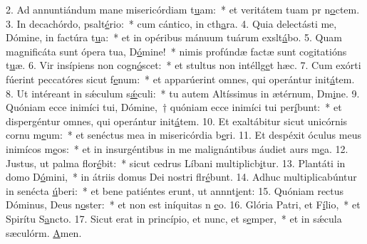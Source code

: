 2. Ad annuntiándum mane misericórdiam t\uline{u}am:~* et veritátem tuam pr n\uline{o}ctem.
3. In decachórdo, psalt\uline{é}rio:~* cum cántico, in cth\uline{a}ra.
4. Quia delectásti me, Dómine, in factúra t\uline{u}a:~* et in opéribus mánuum tuárum exslt\uline{á}bo.
5. Quam magnificáta sunt ópera tua, D\uline{ó}mine!~* nimis profúndæ factæ sunt cogitatións t\uline{u}æ.
6. Vir insípiens non cogn\uline{ó}scet:~* et stultus non intéllg\uline{e}t hæc.
7. Cum exórti fúerint peccatóres sicut f\uline{e}num:~* et apparúerint omnes, qui operántur init\uline{á}tem.
8. Ut intéreant in sǽculum s\uline{ǽ}culi:~* tu autem Altíssimus in ætérnum, Dm\uline{i}ne.
9. Quóniam ecce inimíci tui, Dómine,~† quóniam ecce inimíci tui per\uline{í}bunt:~* et dispergéntur omnes, qui operántur init\uline{á}tem.
10. Et exaltábitur sicut unicórnis cornu m\uline{e}um:~* et senéctus mea in misericórdia b\uline{e}ri.
11. Et despéxit óculus meus inimícos m\uline{e}os:~* et in insurgéntibus in me malignántibus áudiet aurs m\uline{e}a.
12. Justus, ut palma flor\uline{é}bit:~* sicut cedrus Líbani multiplicb\uline{i}tur.
13. Plantáti in domo D\uline{ó}mini,~* in átriis domus Dei nostri flr\uline{é}bunt.
14. Adhuc multiplicabúntur in senécta \uline{ú}beri:~* et bene patiéntes erunt, ut annnt\uline{i}ent:
15. Quóniam rectus Dóminus, Deus n\uline{o}ster:~* et non est iníquitas n \uline{e}o.
16. Glória Patri, et F\uline{í}lio,~* et Spirítu S\uline{a}ncto.
17. Sicut erat in princípio, et nunc, et s\uline{e}mper,~* et in sǽcula sæculórm. \uline{A}men.
